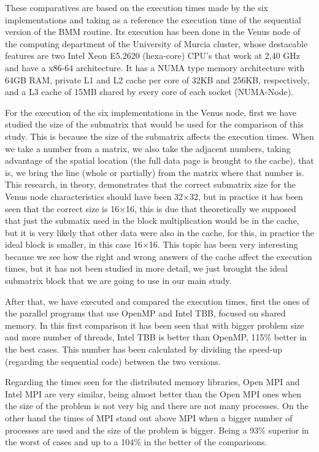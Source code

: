 \documentclass[a4paper,12pt]{article}
\begin{document}
These comparatives are based on the execution times made by the six implementations and  taking as a reference the execution time of the sequential version of the BMM routine. Its execution has been done in the Venus node of the computing department of the University of Murcia cluster, whose destacable features are two Intel Xeon E5.2620 (hexa-core) CPU’s that work at 2,40 GHz and have a x86-64 architecture. It has a NUMA type memory architecture with 64GB RAM, private L1 and L2 cache per core of 32KB and 256KB, respectively, and a L3 cache of 15MB shared by every core of each socket (NUMA-Node).

For the execution of the six implementations in the Venus node, first we have studied the size of the submatrix that would be used for the comparison of this study. This is because the size of the submatrix affects the execution times. When we take a number from a matrix, we also take the adjacent numbers, taking advantage of the spatial location (the full data page is brought to the cache), that is, we bring the line (whole or partially) from the matrix where that number is. This research, in theory, demonstrates that the correct submatrix size for the Venus node characteristics should have been 32$\times$32, but in practice it has been seen that the correct size is 16$\times$16, this is due that theoretically we supposed that just the submatix used in the block multiplication would be in the cache, but it is very likely that other data were also in the cache, for this, in practice the ideal block is smaller, in this case 16$\times$16. This topic has been very interesting because we see how the right and wrong answers of the cache affect the execution times, but it has not been studied in more detail, we just brought the ideal submatrix block that we are going to use in our main study.

After that, we have executed and compared the execution times, first the ones of the parallel programs that use OpenMP and Intel TBB, focused on shared memory. In this first comparison it has been seen that with bigger problem size and more number of threads, Intel TBB is better than OpenMP, 115\% better in the best cases. This number has been calculated by dividing the speed-up (regarding the sequential code) between the two versions.

Regarding the times seen for the distributed memory libraries, Open MPI and Intel MPI are very similar, being almost better than the Open MPI ones when the size of the problem is not very big and there are not many processes. On the other hand the times of MPI stand out above MPI when a bigger number of processes are used and the size of the problem is bigger. Being a 93\% superior in the worst of cases and up to a 104\% in the better of the comparisons.
\end{document}

